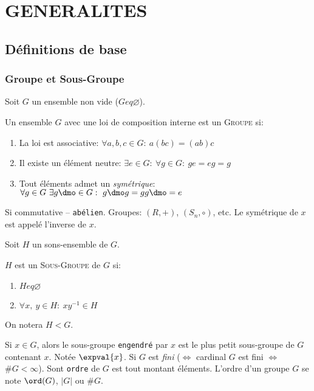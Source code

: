 \chapter{GENERALITES} %
\label{cha:generalites}

\section{Définitions de base}
\subsection{Groupe et Sous-Groupe} %
\label{sub:groupe_et_sous_groupe}

Soit $G$ un ensemble non vide ($G eq\varnothing$).
\begin{definition}
	Un ensemble $G$ avec une loi de composition interne est un \textsc{Groupe} si:
	\begin{enumerate}
		\item La loi est associative: $\forall a,b,c\in G:\ a(bc)=(ab)c$ 
		\item Il existe un élément neutre: $\exists e\in G:\ \forall g\in G:\ ge=eg=g$
		\item Tout éléments admet un \emph{symétrique}: $\forall g\in G\ \exists g\dmo \in G:\ g\dmo g=gg\dmo=e$
	\end{enumerate}
\end{definition}

Si commutative -- \texttt{abélien}. Groupes: $(R, +)$, $(S_n, \circ)$, etc. Le symétrique de $x$ est appelé l'inverse de $x$.

Soit $H$ un sons-ensemble de $G$.
\begin{definition}
	$H$ est un \textsc{Sous-Groupe} de $G$ si:
	\begin{enumerate}
		\item $H eq\varnothing$
		\item $\forall x,\ y \in H:\ xy^{-1}\in H$
	\end{enumerate}
	On notera $H < G$.
\end{definition}

Si $x\in G$, alors le sous-groupe \texttt{engendré} par $x$ est le plus petit sous-groupe de $G$ contenant $x$. Notée $\expval{x}$. Si $G$ est \emph{fini} ($\Leftrightarrow$ cardinal $G$ est fini $\Leftrightarrow$ $\#G<\infty$). Sont \texttt{ordre} de $G$ est tout montant éléments. L'ordre d'un groupe $G$ se note $\ord(G)$, $|G|$ ou $\#G$.

